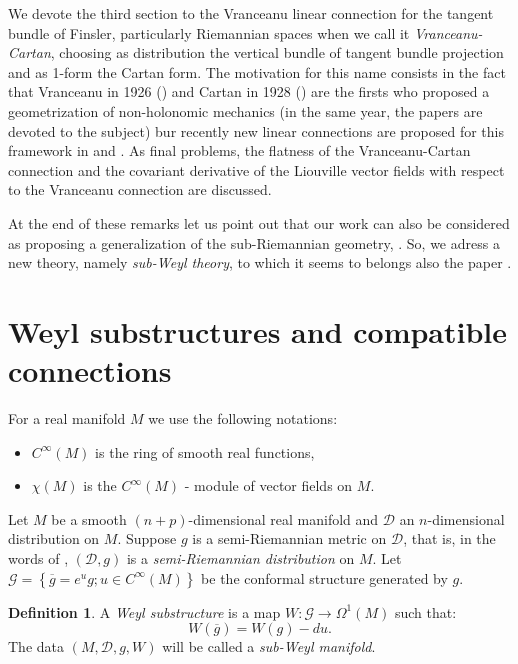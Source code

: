 \documentclass[11pt,oneside,english]{amsart}
\numberwithin{equation}{section}
\numberwithin{figure}{section}
\theoremstyle{plain}
\theoremstyle{definition}
\newtheorem{defn}[thm]{Definition}
\theoremstyle{definition}
\theoremstyle{plain}
\theoremstyle{plain}
\theoremstyle{remark}
\theoremstyle{remark}
\begin{document}
We devote the third section to the Vranceanu linear connection for
the tangent bundle of Finsler, particularly Riemannian spaces when
we call it \textit{Vranceanu-Cartan}, choosing as distribution the
vertical bundle of tangent bundle projection and as 1-form the Cartan
form. The motivation for this name consists in the fact that Vranceanu
in 1926 (\cite{g:v1}) and Cartan in 1928 (\cite{e:c}) are the firsts
who proposed a geometrization of non-holonomic mechanics (in the same
year, the papers \cite{j:a:s,s:y,g:v2} are devoted to the subject)
bur recently new linear connections are proposed for this framework
in \cite{b:j} and \cite{d:g}. As final problems, the flatness of
the Vranceanu-Cartan connection and the covariant derivative of the
Liouville vector fields with respect to the Vranceanu connection are
discussed.

At the end of these remarks let us point out that our work can also
be considered as proposing a generalization of the sub-Riemannian
geometry, \cite{r:m}. So, we adress a new theory, namely \emph{sub-Weyl
theory}, to which it seems to belongs also the paper \cite{z:p}.

\section{Weyl substructures and compatible connections}

For a real manifold $M$ we use the following notations: 

\begin{itemize}
\item $C^{\infty}(M)$ is the ring of smooth real functions,
\item $\chi(M)$ is  the $C^{\infty}(M)$ - module of vector fields on $M.$
\end{itemize}
\medskip{}

Let $M$ be a smooth $\left(n+p\right)$-di\-men\-sio\-nal real
manifold and $\mathcal{D}$ an $n$-di\-men\-sio\-nal distribution
on $M$. Suppose $g$ is a semi-Riemannian metric on $\mathcal{D}$,
that is, in the words of \cite[p. 23]{b:f}, $\left(\mathcal{D},g\right)$
is a \textit{semi-Riemannian distribution} on $M$. Let $\mathcal{G}=\left\{ \overline{g}=e^{u}g;u\in C^{\infty}\left(M\right)\right\} $
be the conformal structure generated by $g$.

\medskip{}

\begin{defn}
A \textit{Weyl substructure} is a map $W:\mathcal{G}\rightarrow\Omega^{1}\left(M\right)$
such that: \begin{equation}
W\left(\overline{g}\right)=W\left(g\right)-du.\label{eq:2}\end{equation}
 The data $\left(M,\mathcal{D},g,W\right)$ will be called a \textit{sub-Weyl
manifold}.
\end{defn}
\medskip{}
\end{document}
